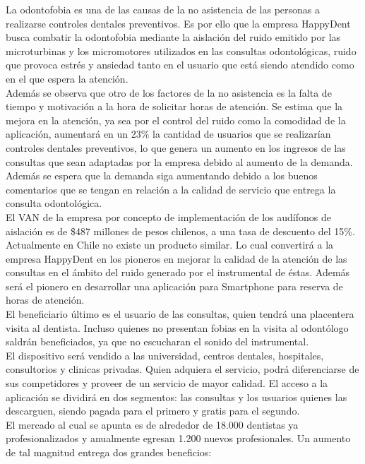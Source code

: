 \documentclass[letterpaper,12pt]{article}
\begin{document}
La odontofobia es una de las causas de la no asistencia de las personas a realizarse controles dentales preventivos. 
Es por ello que la empresa HappyDent busca combatir la odontofobia mediante la aislación del ruido emitido por las microturbinas y los micromotores utilizados en las consultas odontológicas, ruido que provoca estrés y ansiedad tanto en el usuario que está siendo atendido como en el que espera la atención. 
\\[0.5cm]
\indent Además se observa que otro de los factores de la no asistencia es la falta de tiempo y motivación a la hora de solicitar horas de atención.
Se estima que la mejora en la atención, ya sea por el control del ruido como la comodidad de la aplicación, aumentará en un 23\% la cantidad de usuarios que se realizarían controles dentales preventivos, lo que genera un aumento en los ingresos de las consultas que sean adaptadas por la empresa debido al aumento de la demanda. 
Además se espera que la demanda siga aumentando debido a los buenos comentarios que se tengan en relación a la calidad de servicio que entrega la consulta odontológica.
\\[0.5cm]
\indent El VAN de la empresa por concepto de implementación de los audífonos de aislación es de \$487 millones de pesos chilenos, a una tasa de descuento del 15\%.
\\[0.5cm]
\indent Actualmente en Chile no existe un producto similar. 
Lo cual convertirá a la empresa HappyDent en los pioneros en mejorar la calidad de la atención de las consultas en el ámbito del ruido generado por el instrumental de éstas. 
Además será el pionero en desarrollar una aplicación para Smartphone para reserva de horas de atención.
\\[0.5cm]
\indent El beneficiario último es el usuario de las consultas, quien tendrá una placentera visita al dentista. 
Incluso quienes no presentan fobias en la visita al odontólogo saldrán beneficiados, ya que no escucharan el sonido del instrumental.
\\[0.5cm]
\indent El dispositivo será vendido a las universidad, centros dentales, hospitales, consultorios y clinicas privadas. 
Quien adquiera el servicio, podrá diferenciarse de sus competidores y proveer de un servicio de mayor calidad. 
El acceso a la aplicación se dividirá en dos segmentos: las consultas y los usuarios quienes las descarguen, siendo pagada para el primero y gratis para el segundo.
\\[0.5cm]
\indent El mercado al cual se apunta es de alrededor de 18.000 dentistas ya profesionalizados y anualmente egresan 1.200 nuevos profesionales. 
Un aumento de tal magnitud entrega dos grandes beneficios:
\end{document}
